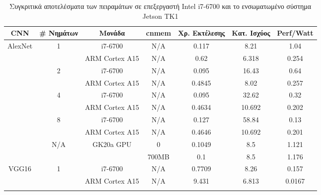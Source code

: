 \begin{table}[H]
  \begin{center}
    \caption{Συγκριτικά αποτελέσματα των πειραμάτων σε επεξεργαστή Intel i7-6700 και το ενσωματωμένο σύστημα Jetson TK1}
    \label{tab:results_comparative}
    \footnotesize
    \begin{tabular}[center]{ | c | c | c | c | c | c | c | }
      \hline
      \rowcolor{Gray}
      CNN & \# Nημάτων & Μονάδα & cnmem & Χρ. Eκτέλεσης & Κατ. Ισχύος & Perf/Watt \\
      \hline
      \multirow{10}{*}{AlexNet}   & \multirow{2}{*}{1}    & i7-6700                     & N/A     & 0.117   & 8.21    & 1.04    \\ \cline{3-7}
                                  &                       & ARM Cortex A15              & N/A     & 0.62    & 6.318   & 0.254   \\ \cline{2-7}
                                  & \multirow{2}{*}{2}    & i7-6700                     & N/A     & 0.095   & 16.43   & 0.64    \\ \cline{3-7}
                                  &                       & ARM Cortex A15              & N/A     & 0.4845  & 8.02    & 0.257   \\ \cline{2-7}
                                  & \multirow{2}{*}{4}    & i7-6700                     & N/A     & 0.095   & 32.62   & 0.32    \\ \cline{3-7}
                                  &                       & ARM Cortex A15              & N/A     & 0.4634  & 10.692  & 0.202   \\ \cline{2-7}
                                  & \multirow{2}{*}{8}    & i7-6700                     & N/A     & 0.127   & 58.84   & 0.13    \\ \cline{3-7}
                                  &                       & ARM Cortex A15              & N/A     & 0.4646  & 10.692  & 0.201   \\ \cline{2-7}
                                  & \multirow{2}{*}{N/A}  & \multirow{2}{*}{GK20a GPU}  & 0       & 0.1049  & 8.5     & 1.121   \\ \cline{4-7}
                                  &                       &                             & 700MB   & 0.1     & 8.5     & 1.176   \\ \hline
      \multirow{10}{*}{VGG16}     & \multirow{2}{*}{1}    & i7-6700                     & N/A     & 0.7709  & 8.26    & 0.157   \\ \cline{3-7}
                                  &                       & ARM Cortex A15              & N/A     & 9.431   & 6.813   & 0.0167  \\ \cline{2-7}

\end{tabular}
\end{center}
\end{table}
